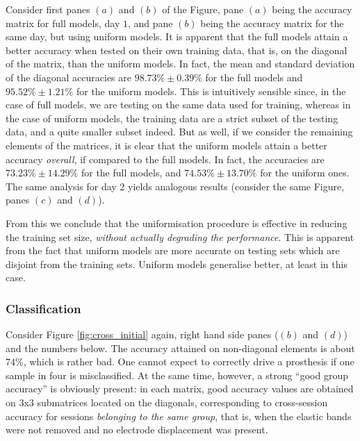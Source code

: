 Consider first panes $(a)$ and $(b)$ of the Figure, pane $(a)$ being
the accuracy matrix for full models, day $1$, and pane $(b)$ being the
accuracy matrix for the same day, but using uniform models. It is
apparent that the full models attain a better accuracy when tested on
their own training data, that is, on the diagonal of the matrix, than
the uniform models. In fact, the mean and standard deviation of the
diagonal accuracies are $98.73\% \pm 0.39\%$ for the full models and
$95.52\% \pm 1.21\%$ for the uniform models. This is intuitively
sensible since, in the case of full models, we are testing on the same
data used for training, whereas in the case of uniform models, the
training data are a strict subset of the testing data, and a quite
smaller subset indeed. But as well, if we consider the remaining
elements of the matrices, it is clear that the uniform models attain a
better accuracy \emph{overall}, if compared to the full models. In
fact, the accuracies are $73.23\% \pm 14.29\%$ for the full models,
and $74.53\% \pm 13.70\%$ for the uniform ones. The same analysis for
day $2$ yields analogous results (consider the same Figure, panes
$(c)$ and $(d)$).

From this we conclude that the uniformisation procedure is effective
in reducing the training set size, \emph{without actually degrading
the performance}. This is apparent from the fact that uniform models
are more accurate on testing sets which are disjoint from the training
sets. Uniform models generalise better, at least in this case.

\subsubsection{Classification}

Consider Figure \ref{fig:cross_initial} again, right hand side panes
($(b)$ and $(d)$) and the numbers below. The accuracy attained on
non-diagonal elements is about $74\%$, which is rather bad. One cannot
expect to correctly drive a prosthesis if one sample in four is
misclassified. At the same time, however, a strong ``good group
accuracy'' is obviously present: in each matrix, good accuracy values
are obtained on 3x3 submatrices located on the diagonals,
corresponding to cross-session accuracy for sessions \emph{belonging
to the same group}, that is, when the elastic bands were not removed
and no electrode displacement was present.

